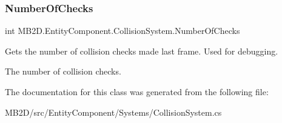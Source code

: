 \subsubsection{\texorpdfstring{Number\+Of\+Checks}{NumberOfChecks}}
{\footnotesize\ttfamily int M\+B2\+D.\+Entity\+Component.\+Collision\+System.\+Number\+Of\+Checks\hspace{0.3cm}{\ttfamily [get]}}



Gets the number of collision checks made last frame. Used for debugging. 

The number of collision checks.

The documentation for this class was generated from the following file\+:\begin{DoxyCompactItemize}
\item 
M\+B2\+D/src/\+Entity\+Component/\+Systems/Collision\+System.\+cs\end{DoxyCompactItemize}
